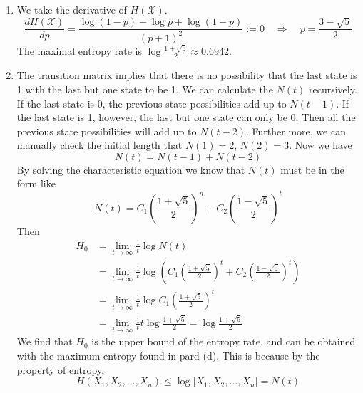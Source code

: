 \begin{exercise}
\begin{solution}
\begin{enumerate}
{    }
    \item { We take the derivative of $H(\mathcal{X})$.
    \begin{equation}
        \frac{d H(\mathcal{X})}{dp} = \frac{\log(1-p) -\log p+\log(1-p)}{(p+1)^2} := 0 \quad 
        \Rightarrow \quad p =  \frac{3- \sqrt{5}}{2}
    \end{equation}
    The maximal entropy rate is $\log \frac{1+\sqrt{5}}{2} \approx 0.6942$.
    }
    \item {
      The transition matrix implies that there is no possibility that the last state is 1 with the last but one state to be 1. We can calculate the $N(t)$ recursively. If the last state is 0, the previous state possibilities add up to $N(t-1)$. If the last state is 1, however, the last but one state can only be 0. Then all the previous state possibilities will add up to $N(t-2)$. Further more, we can manually check the initial length that $N(1) = 2$, $N(2) = 3$. Now we have 
      \begin{equation}
        N(t) = N(t-1) + N(t-2)
      \end{equation}
      By solving the characteristic equation we know that $N(t)$ must be in the form like
      \begin{equation}
        N(t) = C_1 (\frac{1+\sqrt{5}}{2})^n + C_2 (\frac{1-\sqrt{5}}{2})^t
      \end{equation}
      Then
      \begin{equation}
        \begin{aligned}
          H_{0} &=\lim _{t \rightarrow \infty} \frac{1}{t} \log N(t) \\
          &= \lim _{t \rightarrow \infty} \frac{1}{t} \log \left(C_1 (\frac{1+\sqrt{5}}{2})^t + C_2 (\frac{1-\sqrt{5}}{2})^t\right) \\
          &= \lim _{t \rightarrow \infty} \frac{1}{t} \log C_1 (\frac{1+\sqrt{5}}{2})^t \\
          &= \lim _{t \rightarrow \infty} \frac{1}{t} t \log \frac{1+\sqrt{5}}{2} = \log \frac{1+\sqrt{5}}{2}
        \end{aligned}
      \end{equation}
      We find that $H_0$ is the upper bound of the entropy rate, and can be obtained with the maximum entropy found in pard (d). This is because by the property of entropy,
      \begin{equation}
        H\left(X_{1}, X_{2}, \ldots, X_{n}\right) \le \log |X_{1}, X_{2}, \ldots, X_{n}| = N(t)
      \end{equation}
    }
  \end{enumerate}
  \end{solution}
  \label{ex4-10}
\end{exercise}

